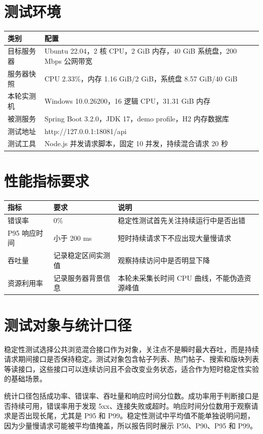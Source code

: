 \documentclass[UTF8,a4paper,12pt]{ctexart}
\begin{document}
\section{测试环境}
\begin{longtable}{P{3.2cm}P{10.8cm}}
\toprule
类别 & 配置\\
\midrule
目标服务器 & Ubuntu 22.04，2 核 CPU，2 GiB 内存，40 GiB 系统盘，200 Mbps 公网带宽\\
服务器快照 & CPU 2.33\%，内存 1.16 GiB/2 GiB，系统盘 8.57 GiB/40 GiB\\
本轮实测机 & Windows 10.0.26200，16 逻辑 CPU，31.31 GiB 内存\\
被测服务 & Spring Boot 3.2.0，JDK 17，demo profile，H2 内存数据库\\
测试地址 & http://127.0.0.1:18081/api\\
测试工具 & Node.js 并发请求脚本，固定 10 并发，持续混合请求 20 秒\\
\bottomrule
\end{longtable}

\section{性能指标要求}
\begin{longtable}{P{3.2cm}P{4.2cm}P{6.2cm}}
\toprule
指标 & 要求 & 说明\\
\midrule
错误率 & 0\% & 稳定性测试首先关注持续运行中是否出错\\
P95 响应时间 & 小于 200 ms & 短时持续请求下不应出现大量慢请求\\
吞吐量 & 记录稳定区间实测值 & 观察持续访问中是否明显下降\\
资源利用率 & 记录服务器背景信息 & 本轮未采集长时间 CPU 曲线，不能伪造资源峰值\\
\bottomrule
\end{longtable}

\section{测试对象与统计口径}
稳定性测试选择公共浏览混合接口作为对象，关注点不是瞬时最大吞吐，而是持续请求期间接口是否保持稳定。测试对象包含帖子列表、热门帖子、搜索和版块列表等读接口，这些接口可以连续访问且不会改变业务状态，适合作为短时稳定性实验的基础场景。

统计口径包括成功率、错误率、吞吐量和响应时间分位数。成功率用于判断接口是否持续可用，错误率用于发现 5xx、连接失败或超时。响应时间分位数用于观察请求是否出现长尾，尤其是 P95 和 P99。稳定性测试中平均值不能单独说明问题，因为少量慢请求可能被平均值掩盖，所以报告同时展示 P50、P90、P95 和 P99。
\end{document}
